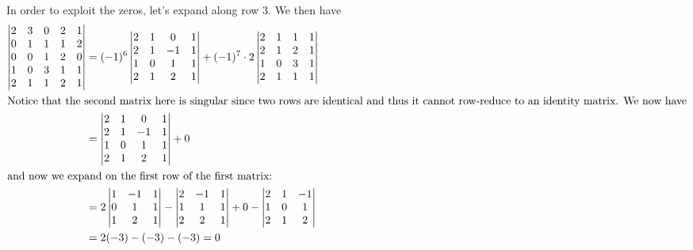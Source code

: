 In order to exploit the zeros, let's expand along row 3.  We then have 
\begin{align*}
\begin{vmatrix}
2 & 3 & 0 & 2 & 1\\
0 & 1 & 1 & 1& 2\\
0 & 0 & 1 & 2 & 0\\ 
1 & 0 & 3 & 1 & 1\\ 
2 & 1 & 1 & 2 & 1
\end{vmatrix}
&= (-1)^6 
\begin{vmatrix}
2 & 1 & 0 & 1 \\ 
2 & 1 & -1 & 1\\ 
1 & 0 & 1 & 1\\
2 & 1 & 2 & 1
\end{vmatrix}
+ (-1)^7 \cdot 
2\begin{vmatrix}
 2 & 1 & 1 & 1\\ 
2 & 1 & 2 & 1\\
1 & 0 & 3 & 1\\
2 & 1 & 1 & 1
\end{vmatrix}\\
\intertext{Notice that the second matrix here is singular since two rows are identical and thus it cannot row-reduce to an identity matrix. We now have}
&=
\begin{vmatrix}
2 & 1 & 0 & 1 \\ 
2 & 1 & -1 & 1\\ 
1 & 0 & 1 & 1\\
2 & 1 & 2 & 1
\end{vmatrix}
+ 0\\
\intertext{and now we expand on the first row of the first matrix:}
&= 2 
\begin{vmatrix} 
1 & -1 & 1\\
0 & 1 & 1\\
1 & 2 & 1 
\end{vmatrix} - 
\begin{vmatrix} 
2 & -1 & 1\\
1 & 1 & 1\\ 
2 & 2 & 1 
\end{vmatrix} + 0 - 
\begin{vmatrix}
2 & 1 & -1 \\ 
1 & 0 & 1\\ 
2 & 1 & 2 
\end{vmatrix}\\
%
&= 2(-3) - (-3) - (-3) = 0
\end{align*}